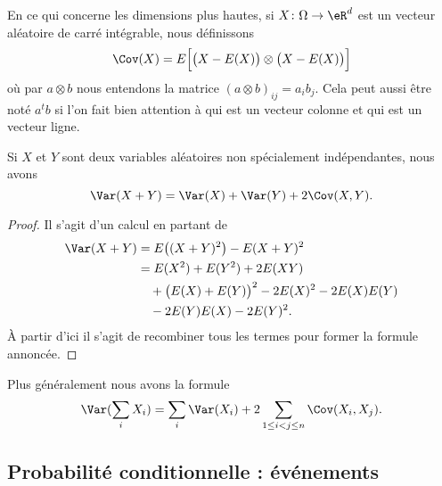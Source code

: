 En ce qui concerne les dimensions plus hautes, si \( X\colon \Omega\to \eR^d\) est un vecteur aléatoire de carré intégrable, nous définissons
\begin{equation}    \label{EqZlvLWx}
	\Cov(X)=E\Big[ \big(  X-E(X) \big)\otimes\big( X-E(X)\big) \Big]
\end{equation}
où par \( a\otimes b\) nous entendons la matrice \( (a\otimes b)_{ij}=a_ib_j\). Cela peut aussi être noté \( a^tb\) si l'on fait bien attention à qui est un vecteur colonne et qui est un vecteur ligne.

\begin{proposition}     \label{PropoVarXpYCov}
	Si \( X\) et \( Y\) sont deux variables aléatoires non spécialement indépendantes, nous avons
	\begin{equation}
		\Var(X+Y)=\Var(X)+\Var(Y)+2\Cov(X,Y).
	\end{equation}
\end{proposition}

\begin{proof}
	Il s'agit d'un calcul en partant de
	\begin{equation}
		\begin{aligned}[]
			\Var(X+Y) & =E\big( (X+Y)^2 \big)-E(X+Y)^2                  \\
			          & =E(X^2)+E(Y^2)+2E(XY)                           \\
			          & \quad+\big( E(X)+E(Y) \big)^2-2E(X)^2-2E(X)E(Y) \\
			          & \quad-2 E(Y)E(X)-2E(Y)^2.
		\end{aligned}
	\end{equation}
	À partir d'ici il s'agit de recombiner tous les termes pour former la formule annoncée.
\end{proof}

Plus généralement nous avons la formule
\begin{equation}
	\Var(\sum_i X_i)=\sum_i\Var(X_i)+2\sum_{1\leq i< j\leq n}\Cov(X_i,X_j).
\end{equation}

\subsection{Probabilité conditionnelle : événements}

